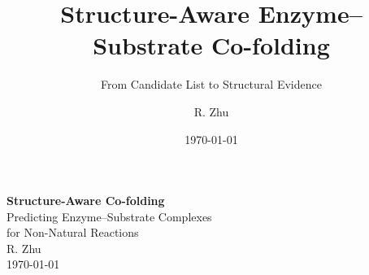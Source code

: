\documentclass[aspectratio=169, 11pt]{beamer}
\title{Structure-Aware Enzyme--Substrate Co-folding}
\subtitle{From Candidate List to Structural Evidence}
\author{R. Zhu}
\date{\today}
\begin{document}
{
\begin{frame}[plain]
\vfill
\begin{center}
{\Huge\bfseries\color{white} Structure-Aware Co-folding}\\[10pt]
{\Large\color{lightblue} Predicting Enzyme--Substrate Complexes\\for Non-Natural Reactions}\\[24pt]
{\large\color{white} R. Zhu}\\[6pt]
{\normalsize\color{lightblue!70} \today}
\end{center}
\vfill
\end{frame}
}
\end{document}
